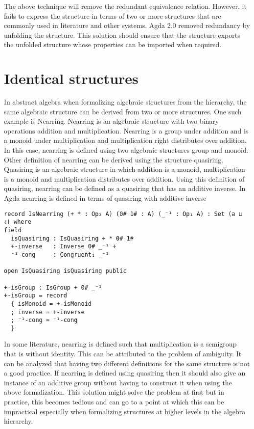 The above technique will remove the redundant equivalence relation. However, it
fails to express the structure in terms of two or more structures that are
commonly used in literature and other systems. Agda 2.0 removed redundancy by
unfolding the structure. This solution should ensure that the structure exports
the unfolded structure whose properties can be imported when required.

\section{Identical structures}
In abstract algebra when formalizing algebraic structures from the hierarchy,
the same algebraic structure can be derived from two or more structures. One such
example is Nearring. Nearring is an algebraic structure with two binary
operations addition and multiplication. Nearring is a group under addition and
is a monoid under multiplication and multiplication right distributes over
addition. In this case, nearring is defined using two algebraic structures group
and monoid. Other definition of nearring can be derived using the structure
quasiring. Quasiring is an algebraic structure in which addition is a monoid,
multiplication is a monoid and multiplication distributes over addition. Using
this definition of quasiring, nearring can be defined as a quasiring that has
an additive inverse. In Agda nearring is defined in terms of quasiring with
additive inverse 

\begin{verbatim}
record IsNearring (+ * : Op₂ A) (0# 1# : A) (_⁻¹ : Op₁ A) : Set (a ⊔ ℓ) where
field
  isQuasiring : IsQuasiring + * 0# 1#
  +-inverse   : Inverse 0# _⁻¹ +
  ⁻¹-cong     : Congruent₁ _⁻¹

open IsQuasiring isQuasiring public

+-isGroup : IsGroup + 0# _⁻¹
+-isGroup = record 
  { isMonoid = +-isMonoid 
  ; inverse = +-inverse 
  ; ⁻¹-cong = ⁻¹-cong 
  }
\end{verbatim}

In some literature, nearring is defined such that multiplication is a
semigroup that is without identity. This can be attributed to the problem of
ambiguity. It can be analyzed that having two different definitions for the same
structure is not a good practice. If nearring is defined using quasiring then
it should also give an instance of an additive group without having to construct
it when using the above formalization. This solution might solve the problem at
first but in practice, this becomes tedious and can go to a point at which this
can be impractical especially when formalizing structures at higher levels in the
algebra hierarchy.

